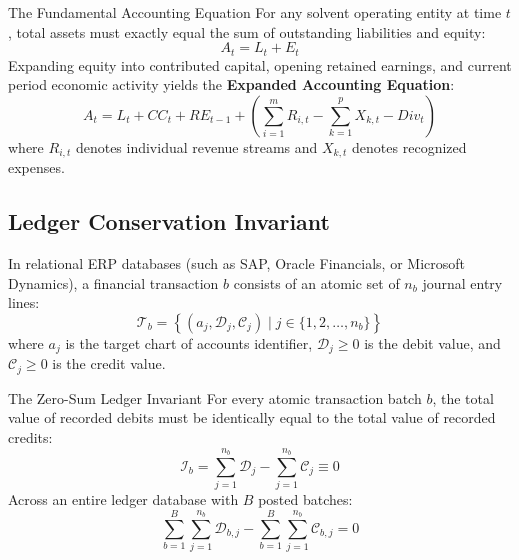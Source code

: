 \begin{definitionbox}{The Fundamental Accounting Equation}
For any solvent operating entity at time $t$, total assets must exactly equal the sum of outstanding liabilities and equity:
\begin{equation}
A_t = L_t + E_t
\label{eq:pacioli_basic}
\end{equation}
Expanding equity into contributed capital, opening retained earnings, and current period economic activity yields the \textbf{Expanded Accounting Equation}:
\begin{equation}
A_t = L_t + CC_t + RE_{t-1} + \left(\sum_{i=1}^m R_{i,t} - \sum_{k=1}^p X_{k,t} - Div_t\right)
\label{eq:pacioli_expanded}
\end{equation}
where $R_{i,t}$ denotes individual revenue streams and $X_{k,t}$ denotes recognized expenses.
\end{definitionbox}

\subsection{Ledger Conservation Invariant}
In relational ERP databases (such as SAP, Oracle Financials, or Microsoft Dynamics), a financial transaction $b$ consists of an atomic set of $n_b$ journal entry lines:
\begin{equation}
\mathcal{T}_b = \left\{ (a_j, \mathcal{D}_j, \mathcal{C}_j) \mid j \in \{1, 2, \dots, n_b\} \right\}
\end{equation}
where $a_j$ is the target chart of accounts identifier, $\mathcal{D}_j \ge 0$ is the debit value, and $\mathcal{C}_j \ge 0$ is the credit value.

\begin{theorembox}{The Zero-Sum Ledger Invariant}
For every atomic transaction batch $b$, the total value of recorded debits must be identically equal to the total value of recorded credits:
\begin{equation}
\mathcal{I}_b = \sum_{j=1}^{n_b} \mathcal{D}_j - \sum_{j=1}^{n_b} \mathcal{C}_j \equiv 0
\label{eq:zero_sum_invariant}
\end{equation}
Across an entire ledger database with $B$ posted batches:
\begin{equation}
\sum_{b=1}^B \sum_{j=1}^{n_b} \mathcal{D}_{b,j} - \sum_{b=1}^B \sum_{j=1}^{n_b} \mathcal{C}_{b,j} = 0
\end{equation}
\end{theorembox}

